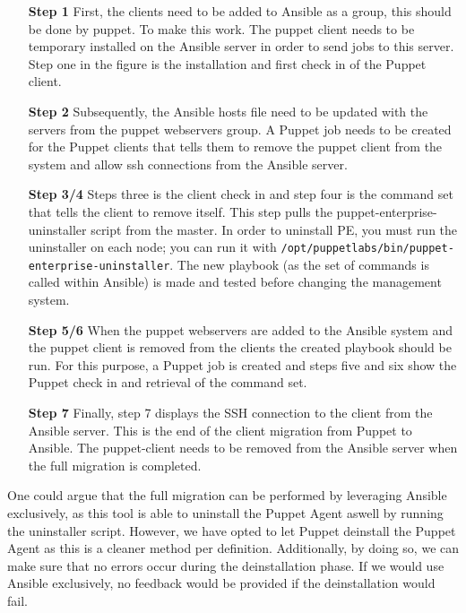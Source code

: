 \indent
\begin{itemize}
    \item[\bf Step 1] First, the clients need to be added to Ansible as a group, this should be done by puppet. To make this work. The puppet client needs to be temporary installed on the Ansible server in order to send jobs to this server. Step one in the figure is the installation and first check in of the Puppet client.
    \item[\bf Step 2] Subsequently, the Ansible hosts file need to be updated with the servers from the puppet webservers group. A Puppet job needs to be created for the Puppet clients that tells them to remove the puppet client from the system and allow ssh connections from the Ansible server.
    \item[\bf Step 3/4] Steps three is the client check in and step four is the command set that tells the client to remove itself. This step pulls the puppet-enterprise-uninstaller script from the master. In order to uninstall PE, you must run the uninstaller on each node; you can run it with \texttt{/opt/puppetlabs/bin/puppet-enterprise-uninstaller}. The new playbook (as the set of commands is called within Ansible) is made and tested before changing the management system.
    \item[\bf Step 5/6] When the puppet webservers are added to the Ansible system and the puppet client is removed from the clients the created playbook should be run. For this purpose, a Puppet job is created and steps five and six show the Puppet check in and retrieval of the command set.
    \item[\bf Step 7] Finally, step 7 displays the SSH connection to the client from the Ansible server. This is the end of the client migration from Puppet to Ansible. The puppet-client needs to be removed from the Ansible server when the full migration is completed.
\end{itemize}

One could argue that the full migration can be performed by leveraging Ansible exclusively, as this tool is able to uninstall the Puppet Agent aswell by running the uninstaller script. However, we have opted to let Puppet deinstall the Puppet Agent as this is a cleaner method per definition. Additionally, by doing so, we can make sure that no errors occur during the deinstallation phase. If we would use Ansible exclusively, no feedback would be provided if the deinstallation would fail.

